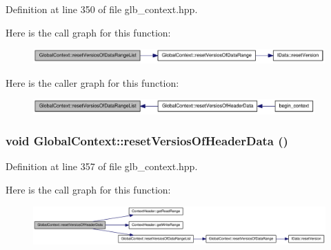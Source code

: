 Definition at line 350 of file glb\_\-context.hpp.

Here is the call graph for this function:\nopagebreak
\begin{figure}[H]
\begin{center}
\leavevmode
\includegraphics[width=317pt]{class_global_context_acc65a1acfefed680d1d05345d1bf9ab8_cgraph}
\end{center}
\end{figure}


Here is the caller graph for this function:\nopagebreak
\begin{figure}[H]
\begin{center}
\leavevmode
\includegraphics[width=307pt]{class_global_context_acc65a1acfefed680d1d05345d1bf9ab8_icgraph}
\end{center}
\end{figure}
\hypertarget{class_global_context_aa903129142d1e7420aa521b89e77789b}{
\subsubsection[{resetVersiosOfHeaderData}]{\setlength{\rightskip}{0pt plus 5cm}void GlobalContext::resetVersiosOfHeaderData ()}}
\label{class_global_context_aa903129142d1e7420aa521b89e77789b}


Definition at line 357 of file glb\_\-context.hpp.

Here is the call graph for this function:\nopagebreak
\begin{figure}[H]
\begin{center}
\leavevmode
\includegraphics[width=420pt]{class_global_context_aa903129142d1e7420aa521b89e77789b_cgraph}
\end{center}
\end{figure}


